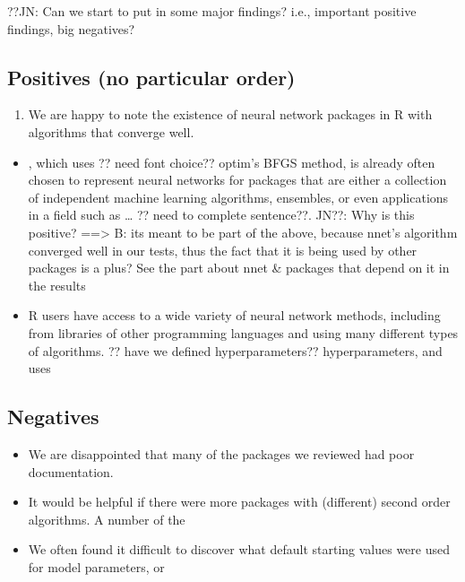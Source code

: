 ??JN: Can we start to put in some major findings? i.e., important
positive findings, big negatives?

\hypertarget{positives-no-particular-order}{%
\subsection{Positives (no particular
order)}\label{positives-no-particular-order}}

\begin{enumerate}
\def\labelenumi{\arabic{enumi}.}
\tightlist
\item
  We are happy to note the existence of neural network packages in R
  with algorithms that converge well.
\end{enumerate}

\begin{itemize}
\tightlist
\item
  , which uses ?? need font choice?? optim's BFGS method, is
  already often chosen to represent neural networks for packages that
  are either a collection of independent machine learning algorithms,
  ensembles, or even applications in a field such as \ldots{} ?? need to
  complete sentence??. JN??: Why is this positive? ==\textgreater{} B:
  its meant to be part of the above, because nnet's algorithm converged
  well in our tests, thus the fact that it is being used by other
  packages is a plus? See the part about nnet \& packages that depend on
  it in the results
\item
  R users have access to a wide variety of neural network methods,
  including from libraries of other programming languages and using many
  different types of algorithms. ?? have we defined hyperparameters??
  hyperparameters, and uses
\end{itemize}

\hypertarget{negatives}{%
\subsection{Negatives}\label{negatives}}

\begin{itemize}
\tightlist
\item
  We are disappointed that many of the packages we reviewed had poor
  documentation.
\item
  It would be helpful if there were more packages with (different)
  second order algorithms. A number of the
\item
  We often found it difficult to discover what default starting values
  were used for model parameters, or
\end{itemize}

